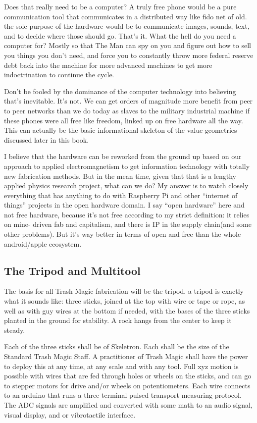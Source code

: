 Does that really need to be a computer? A truly free phone would be a
pure communication tool that communicates in a distributed way like fido
net of old. the sole purpose of the hardware would be to communicate
images, sounds, text, and to decide where those should go. That's it.
What the hell do you need a computer for? Mostly so that The Man can spy
on you and figure out how to sell you things you don't need, and force
you to constantly throw more federal reserve debt back into the machine
for more advanced machines to get more indoctrination to continue the
cycle.

Don't be fooled by the dominance of the computer technology into
believing that's inevitable. It's not. We can get orders of magnitude
more benefit from peer to peer networks than we do today as slaves to
the military industrial machine if these phones were all free like
freedom, linked up on free hardware all the way. This can actually be
the basic informational skeleton of the value geometries discussed later
in this book.

I believe that the hardware can be reworked from the ground up based on
our approach to applied electromagnetism to get information technology
with totally new fabrication methods. But in the mean time, given that
that is a lengthy applied physics research project, what can we do? My
answer is to watch closely everything that has anything to do with
Raspberry Pi and other ``internet of things'' projects in the open
hardware domain. I say ``open hardware'' here and not free hardware,
because it's not free according to my strict definition: it relies on
mine- driven fab and capitalism, and there is IP in the supply chain(and
some other problems). But it's way better in terms of open and free than
the whole android/apple ecosystem.

\subsection{The Tripod and Multitool}\label{the-tripod-and-multitool}

The basis for all Trash Magic fabrication will be the tripod. a tripod
is exactly what it sounds like: three sticks, joined at the top with
wire or tape or rope, as well as with guy wires at the bottom if needed,
with the bases of the three sticks planted in the ground for stability.
A rock hangs from the center to keep it steady.

Each of the three sticks shall be of Skeletron. Each shall be the size
of the Standard Trash Magic Staff. A practitioner of Trash Magic shall
have the power to deploy this at any time, at any scale and with any
tool. Full xyz motion is possible with wires that are fed through holes
or wheels on the sticks, and can go to stepper motors for drive and/or
wheels on potentiometers. Each wire connects to an arduino that runs a
three terminal pulsed transport measuring protocol. The ADC signals are
amplified and converted with some math to an audio signal, visual
display, and or vibrotactile interface.

